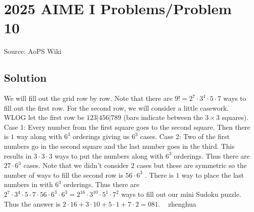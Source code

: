 \documentclass[12pt]{article}
\begin{document}
\section*{{2025 AIME I Problems/Problem 10}}
Source: AoPS Wiki

\subsection*{Solution}
We will fill out the grid row by row. Note that there are $9!=2^7\cdot 3^4\cdot 5\cdot 7$ ways to fill out the first row. For the second row, we will consider a little casework. WLOG let the first row be $123 | 456 | 789$ (bars indicate between the $3\times 3$ squares). Case 1: Every number from the first square goes to the second square. Then there is $1$ way along with $6^3$ orderings giving us $6^3$ cases. Case 2: Two of the first numbers go in the second square and the last number goes in the third. This results in $3\cdot3\cdot3$ ways to put the numbers along with $6^3$ orderings. Thus there are $27\cdot 6^3$ cases. Note that we didn't consider $2$ cases but these are symmetric so the number of ways to fill the second row is $56\cdot 6^3$ . There is $1$ way to place the last numbers in with $6^3$ orderings. Thus there are $2^7\cdot 3^4\cdot 5\cdot 7 \cdot 56\cdot 6^3 \cdot 6^3 = 2^{16}\cdot 3^{10}\cdot 5^1\cdot 7^2$ ways to fill out our mini Sudoku puzzle. Thus the answer is $2\cdot 16+3\cdot 10 + 5\cdot 1+7\cdot 2 = \boxed{081}.$ ~ zhenghua
\end{document}
